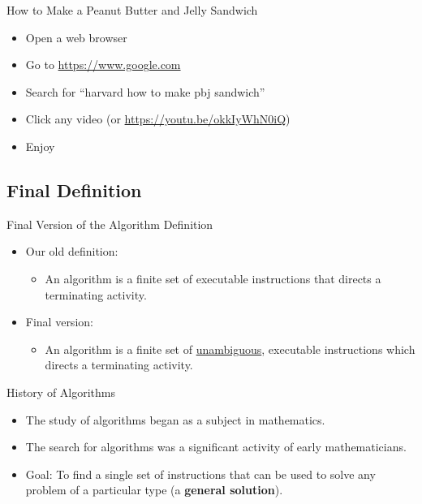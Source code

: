 \documentclass[graphics]{beamer}
\begin{document}
\begin{frame}{How to Make a Peanut Butter and Jelly Sandwich}
    \begin{itemize}
        \item Open a web browser
        \item Go to \url{https://www.google.com}
        \item Search for ``harvard how to make pbj sandwich''
        \item Click any video (or \url{https://youtu.be/okkIyWhN0iQ})
        \item Enjoy
    \end{itemize}
\end{frame}

\subsection{Final Definition}
\begin{frame}{Final Version of the Algorithm Definition}
    \begin{itemize}
        \item Our old definition:
        \begin{itemize}
            \item An algorithm is a finite set of executable instructions that directs a terminating activity.
        \end{itemize}
        \item Final version:
        \begin{itemize}
            \item An algorithm is a finite set of \underline{unambiguous}, executable instructions which directs a terminating activity.
        \end{itemize}
    \end{itemize}
\end{frame}

\begin{frame}{History of Algorithms}
    \begin{itemize}
        \item The study of algorithms began as a subject in mathematics.
        \item The search for algorithms was a significant activity of early mathematicians.
        \item Goal: To find a single set of instructions that can be used to solve any problem of a particular type (a \textbf{general solution}).
    \end{itemize}
\end{frame}
\end{document}
